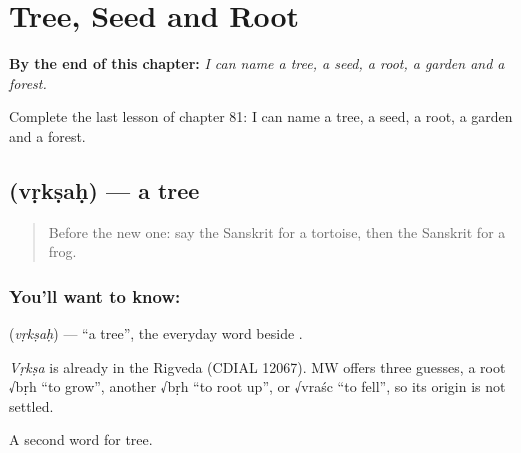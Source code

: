 
\chapter{Tree, Seed and Root}
\label{ch:sa-tree-seed-root}

\begin{chapteropening}
\textbf{By the end of this chapter:} \emph{I can name a tree, a seed, a root, a garden and a forest.}

Complete the last lesson of chapter 81: I can name a tree, a seed, a root, a garden and a forest.
\end{chapteropening}

\section[\texorpdfstring{\sk{वृक्षः} (vṛkṣaḥ)}{वृक्षः (vṛkṣaḥ)}]{ (vṛkṣaḥ) — a tree}

\label{lesson:SA-C81-tree}



\begin{quote}
Before the new one: say the Sanskrit for a tortoise, then the Sanskrit for a frog.
\end{quote}

\subsection*{You'll want to know: }
\textbf{} (\emph{vṛkṣaḥ}) — \textquotedblleft{}a tree\textquotedblright{}, the everyday word beside \textbf{}.

\begin{cousinweb}
\emph{Vṛkṣa} is already in the Rigveda (CDIAL 12067). MW offers three guesses, a root √bṛh \textquotedblleft{}to grow\textquotedblright{}, another √bṛh \textquotedblleft{}to root up\textquotedblright{}, or √vraśc \textquotedblleft{}to fell\textquotedblright{}, so its origin is not settled.
\end{cousinweb}

\begin{grammarlens}[title={What you've built}]
A second word for tree.
\end{grammarlens}

